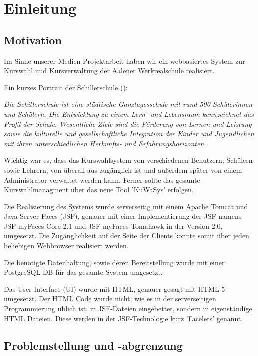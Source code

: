 \section{Einleitung}

\subsection{Motivation}

Im Sinne unserer Medien-Projektarbeit haben wir ein webbasiertes System zur Kurswahl und Kursverwaltung der Aalener Werkrealschule  realisiert.

Ein kurzes Portrait der Schillerschule (\cite{Sch-Po}):

\begin{center}
\textit{
\grqq Die Schillerschule ist eine städtische Ganztagesschule mit rund 500 Schülerinnen und Schülern. Die Entwicklung zu einem Lern- und Lebensraum kennzeichnet das Profil der Schule. Wesentliche Ziele sind die Förderung von Lernen und Leistung sowie die kulturelle und gesellschaftliche Integration der Kinder und Jugendlichen mit ihren unterschiedlichen Herkunfts- und Erfahrungshorizonten.\glqq}
\end{center}

Wichtig war es, dass das Kurswahlsystem von verschiedenen Benutzern, Schülern sowie Lehrern, von überall aus zugänglich ist und außerdem später von einem Administrator verwaltet werden kann. Ferner sollte das gesamte Kurswahlmanagment über das neue Tool 'KuWaSys' erfolgen.

Die Realisierung des Systems wurde serverseitig mit einem \gls{Apache Tomcat} und \gls{Java Server Faces} (JSF), genauer mit einer Implementierung der JSF namens \gls{JSF-myFaces Core} 2.1 und \gls{JSF-myFaces Tomahawk} in der Version 2.0, umgesetzt.
Die Zugänglichkeit auf der Seite der Clients konnte somit über jeden beliebigen Webbrowser realisiert werden.

Die benötigte Datenhaltung, sowie deren Bereitstellung wurde mit einer \gls{PostgreSQL} \ac{DB} für das gesamte System umgesetzt.

Das \gls{User Interface} (UI) wurde mit \gls{HTML}, genauer gesagt mit HTML 5 umgesetzt. Der HTML Code wurde nicht, wie es in der serverseitigen Programmierung üblich ist, in \ac{JSF}-Dateien eingebettet, sondern in eigenständige HTML Dateien.
Diese werden in der \ac{JSF}-Technologie kurz 'Facelets' genannt.

\subsection{Problemstellung und -abgrenzung}\label{subsec:Problemstellung und -abgrenzung}

